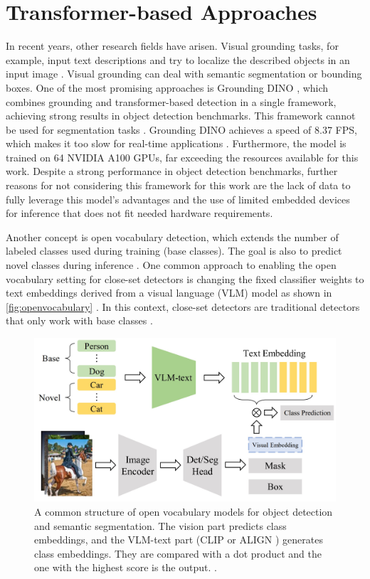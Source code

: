 \section{Transformer-based Approaches}
\label{sec:transformerBasedApproaches}

In recent years, other research fields have arisen.
Visual grounding tasks, for example, input text descriptions and try to localize the described objects in an input image \cite{openvocabularysurvey2024}.
Visual grounding can deal with semantic segmentation or bounding boxes.
One of the most promising approaches is Grounding DINO \cite{groundingdino2024}, which combines grounding and transformer-based detection in a single framework, achieving strong results in object detection benchmarks.
This framework cannot be used for segmentation tasks \cite{glipv22022}.
Grounding DINO achieves a speed of 8.37 \ac{FPS}, which makes it too slow for real-time applications \cite{groundingdino2024}.
Furthermore, the model is trained on 64 NVIDIA A100 GPUs, far exceeding the resources available for this work.
Despite a strong performance in object detection benchmarks, further reasons for not considering this framework for this work are the lack of data to fully leverage this model's advantages and the use of limited embedded devices for inference that does not fit needed hardware requirements.

\vspace{0.5cm}

\noindent Another concept is open vocabulary detection, which extends the number of labeled classes used during training (base classes).
The goal is also to predict novel classes during inference \cite{openvocabularysurvey2024}.
One common approach to enabling the open vocabulary setting for close-set detectors is changing the fixed classifier weights to text embeddings derived from a visual language (VLM) model as shown in \autoref{fig:openvocabulary} \cite{openvocabularysurvey2024}.
In this context, close-set detectors are traditional detectors that only work with base classes \cite{anonymous2024openvocabulary}.

\begin{figure}[H]
    \centering
    \includegraphics[width=0.55\linewidth]{PICs/tansformerSOTA/openvocabulary.jpg}
    \caption{A common structure of open vocabulary models for object detection and semantic segmentation. The vision part predicts class embeddings, and the VLM-text part (CLIP \cite{CLIP2021} or ALIGN \cite{ALIGN2021}) generates class embeddings. They are compared with a dot product and the one with the highest score is the output. \cite{openvocabularysurvey2024}.}
    \label{fig:openvocabulary}
\end{figure}


